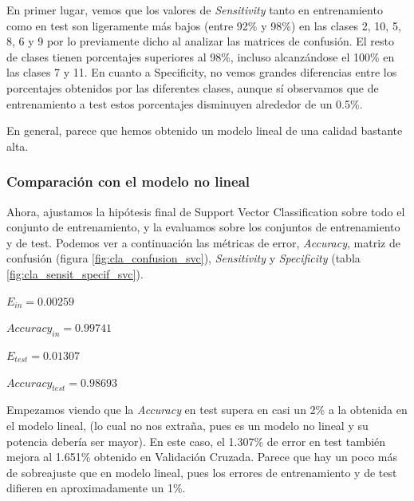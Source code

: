 \documentclass[10pt,a4paper]{article}
\begin{document}
En primer lugar, vemos que los valores de \textit{Sensitivity} tanto en entrenamiento como en test son ligeramente más bajos (entre 92\% y 98\%) en las clases 2, 10, 5, 8, 6 y 9 por lo previamente dicho al analizar las matrices de confusión. El resto de clases tienen porcentajes superiores al 98\%, incluso alcanzándose el 100\% en las clases 7 y 11. En cuanto a Specificity, no vemos grandes diferencias entre los porcentajes obtenidos por las diferentes clases, aunque sí observamos que de entrenamiento a test estos porcentajes disminuyen alrededor de un 0.5\%.

En general, parece que hemos obtenido un modelo lineal de una calidad bastante alta.



\subsubsection{Comparación con el modelo no lineal}

Ahora, ajustamos la hipótesis final de Support Vector Classification sobre todo el conjunto de entrenamiento, y la evaluamos sobre los conjuntos de entrenamiento y de test. Podemos ver a continuación las métricas de error, \textit{Accuracy}, matriz de confusión (figura \ref{fig:cla_confusion_svc}), \textit{Sensitivity} y \textit{Specificity} (tabla \ref{fig:cla_sensit_specif_svc}).

$E_{in} = 0.00259$

$Accuracy_{in} = 0.99741$

$E_{test} = 0.01307$

$Accuracy_{test} = 0.98693$

Empezamos viendo que la \textit{Accuracy} en test supera en casi un 2\% a la obtenida en el modelo lineal, (lo cual no nos extraña, pues es un modelo no lineal y su potencia debería ser mayor). En este caso, el 1.307\% de error en test también mejora al 1.651\% obtenido en Validación Cruzada. Parece que hay un poco más de sobreajuste que en modelo lineal, pues los errores de entrenamiento y de test difieren en aproximadamente un 1\%.
\end{document}
